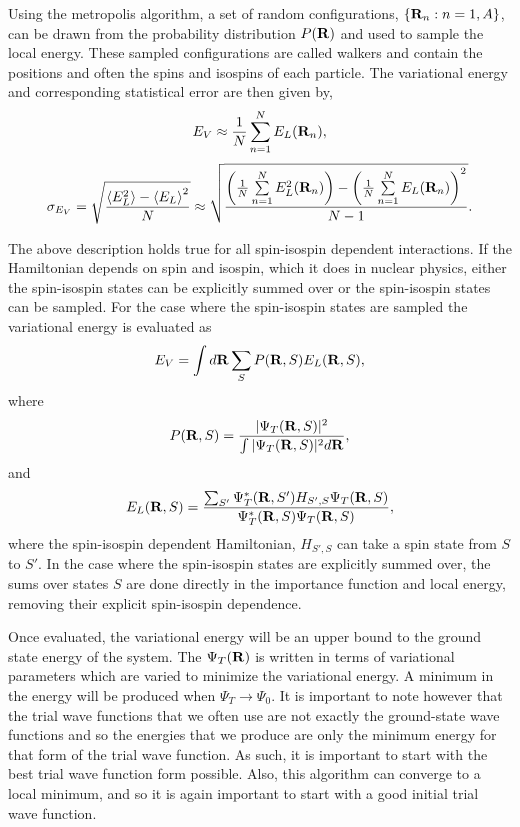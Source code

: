 Using the metropolis algorithm, a set of random configurations, $\{\mathbf{R}_n: n=1,A\}$, can be drawn from the probability distribution $P(\mathbf{R})$ and used to sample the local energy. These sampled configurations are called walkers and contain the positions and often the spins and isospins of each particle. The variational energy and corresponding statistical error are then given by,
\begin{equation} 
  E_V \approx \frac{1}{N} \sum\limits_{n=1}^N E_L({\mathbf{R}_n}),
\end{equation}
\begin{equation} 
  \sigma_{E_V} = \sqrt{\frac{\left<E_L^2\right>-\left<E_L\right>^2}{N}} \approx \sqrt{\frac{\left(\frac{1}{N}\sum\limits_{n=1}^NE_L^2(\mathbf{R}_n)\right) - \left(\frac{1}{N}\sum\limits_{n=1}^NE_L(\mathbf{R}_n)\right)^2}{N-1}}.
\end{equation}

The above description holds true for all spin-isospin dependent interactions. If the Hamiltonian depends on spin and isospin, which it does in nuclear physics, either the spin-isospin states can be explicitly summed over or the spin-isospin states can be sampled. For the case where the spin-isospin states are sampled the variational energy is evaluated as
\begin{equation} 
  E_V = \int d\mathbf{R} \sum\limits_S P(\mathbf{R},S) E_L(\mathbf{R},S),
\end{equation}
where
\begin{equation}
   P(\mathbf{R},S) = \frac{|\Psi_T(\mathbf{R},S)|^2}{\int|\Psi_T(\mathbf{R},S)|^2d\mathbf{R}},
\end{equation}
and
\begin{equation}
   E_L(\mathbf{R},S) = \frac{\sum_{S'}\Psi_T^*(\mathbf{R},S')H_{S',S}\Psi_T(\mathbf{R},S)}{\Psi_T^*(\mathbf{R},S)\Psi_T(\mathbf{R},S)},
\end{equation}
where the spin-isospin dependent Hamiltonian, $H_{S',S}$ can take a spin state from $S$ to $S'$. In the case where the spin-isospin states are explicitly summed over, the sums over states $S$ are done directly in the importance function and local energy, removing their explicit spin-isospin dependence.

Once evaluated, the variational energy will be an upper bound to the ground state energy of the system. The $\Psi_T(\mathbf{R})$ is written in terms of variational parameters which are varied to minimize the variational energy. A minimum in the energy will be produced when $\Psi_T \rightarrow \Psi_0$. It is important to note however that the trial wave functions that we often use are not exactly the ground-state wave functions and so the energies that we produce are only the minimum energy for that form of the trial wave function. As such, it is important to start with the best trial wave function form possible. Also, this algorithm can converge to a local minimum, and so it is again important to start with a good initial trial wave function.

